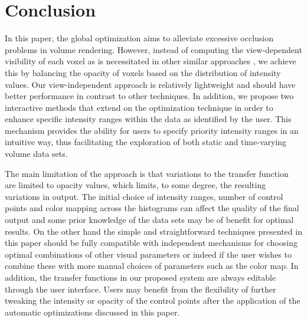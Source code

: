 \section{Conclusion}

In this paper, the global optimization aims to alleviate excessive occlusion problems in volume rendering. However, instead of computing the view-dependent visibility of each voxel as is necessitated in other similar approaches \cite{correa_visibility_2011} \cite{ruiz_automatic_2011}, we achieve this by balancing the opacity of voxels based on the distribution of intensity values. Our view-independent approach is relatively lightweight and should have better performance in contrast to other techniques.
In addition, we propose two interactive methods that extend on the optimization technique in order to enhance specific intensity ranges within the data as identified by the user.
This mechanism provides the ability for users to specify priority intensity ranges in an intuitive way, thus facilitating the exploration of both static and time-varying volume data sets.

The main limitation of the approach is that variations to the transfer function are limited to opacity values, which limits, to some degree, the resulting variations in output. The initial choice of intensity ranges, number of control points and color mapping across the histograms can affect the quality of the final output and some prior knowledge of the data sets may be of benefit for optimal results. On the other hand the simple and straightforward techniques presented in this paper should be fully compatible with independent mechanisms for choosing optimal combinations of other visual parameters or indeed if the user wishes to combine these with more manual choices of parameters such as the color map.
In addition, the transfer functions in our proposed system are always editable through the user interface. Users may benefit from the flexibility of further tweaking the intensity or opacity of the control points after the application of the automatic optimizations discussed in this paper.